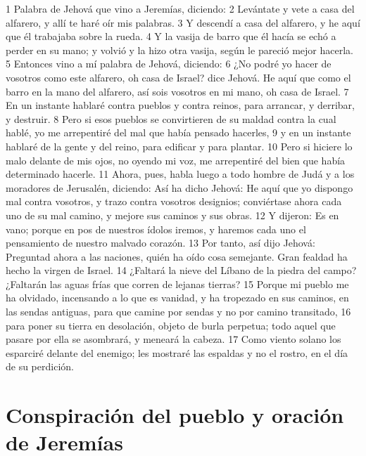 1 Palabra de Jehová que vino a Jeremías, diciendo:
2 Levántate y vete a casa del alfarero, y allí te haré oír mis palabras.
3 Y descendí a casa del alfarero, y he aquí que él trabajaba sobre la rueda.
4 Y la vasija de barro que él hacía se echó a perder en su mano; y volvió y la hizo otra vasija, según le pareció mejor hacerla.
5 Entonces vino a mí palabra de Jehová, diciendo:
6 ¿No podré yo hacer de vosotros como este alfarero, oh casa de Israel? dice Jehová. He aquí que como el barro en la mano del alfarero, así sois vosotros en mi mano, oh casa de Israel.
7 En un instante hablaré contra pueblos y contra reinos, para arrancar, y derribar, y destruir.
8 Pero si esos pueblos se convirtieren de su maldad contra la cual hablé, yo me arrepentiré del mal que había pensado hacerles,
9 y en un instante hablaré de la gente y del reino, para edificar y para plantar.
10 Pero si hiciere lo malo delante de mis ojos, no oyendo mi voz, me arrepentiré del bien que había determinado hacerle.
11 Ahora, pues, habla luego a todo hombre de Judá y a los moradores de Jerusalén, diciendo: Así ha dicho Jehová: He aquí que yo dispongo mal contra vosotros, y trazo contra vosotros designios; conviértase ahora cada uno de su mal camino, y mejore sus caminos y sus obras.
12 Y dijeron: Es en vano; porque en pos de nuestros ídolos iremos, y haremos cada uno el pensamiento de nuestro malvado corazón.
13 Por tanto, así dijo Jehová: Preguntad ahora a las naciones, quién ha oído cosa semejante. Gran fealdad ha hecho la virgen de Israel.
14 ¿Faltará la nieve del Líbano de la piedra del campo? ¿Faltarán las aguas frías que corren de lejanas tierras? 
15 Porque mi pueblo me ha olvidado, incensando a lo que es vanidad, y ha tropezado en sus caminos, en las sendas antiguas, para que camine por sendas y no por camino transitado,
16 para poner su tierra en desolación, objeto de burla perpetua; todo aquel que pasare por ella se asombrará, y meneará la cabeza.
17 Como viento solano los esparciré delante del enemigo; les mostraré las espaldas y no el rostro, en el día de su perdición.

\section*{Conspiración del pueblo y oración de Jeremías}

